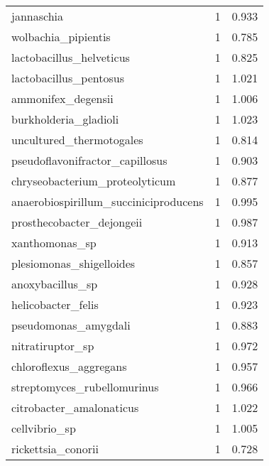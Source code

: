 \begin{tabular}{lrr}
                                  jannaschia &                   1 &     0.933 \\
                         wolbachia\_pipientis &                   1 &     0.785 \\
                    lactobacillus\_helveticus &                   1 &     0.825 \\
                      lactobacillus\_pentosus &                   1 &     1.021 \\
                          ammonifex\_degensii &                   1 &     1.006 \\
                       burkholderia\_gladioli &                   1 &     1.023 \\
                    uncultured\_thermotogales &                   1 &     0.814 \\
             pseudoflavonifractor\_capillosus &                   1 &     0.903 \\
              chryseobacterium\_proteolyticum &                   1 &     0.877 \\
       anaerobiospirillum\_succiniciproducens &                   1 &     0.995 \\
                   prosthecobacter\_dejongeii &                   1 &     0.987 \\
                              xanthomonas\_sp &                   1 &     0.913 \\
                    plesiomonas\_shigelloides &                   1 &     0.857 \\
                            anoxybacillus\_sp &                   1 &     0.928 \\
                          helicobacter\_felis &                   1 &     0.923 \\
                        pseudomonas\_amygdali &                   1 &     0.883 \\
                            nitratiruptor\_sp &                   1 &     0.972 \\
                      chloroflexus\_aggregans &                   1 &     0.957 \\
                 streptomyces\_rubellomurinus &                   1 &     0.966 \\
                    citrobacter\_amalonaticus &                   1 &     1.022 \\
                               cellvibrio\_sp &                   1 &     1.005 \\
                          rickettsia\_conorii &                   1 &     0.728 \\

\end{tabular}
